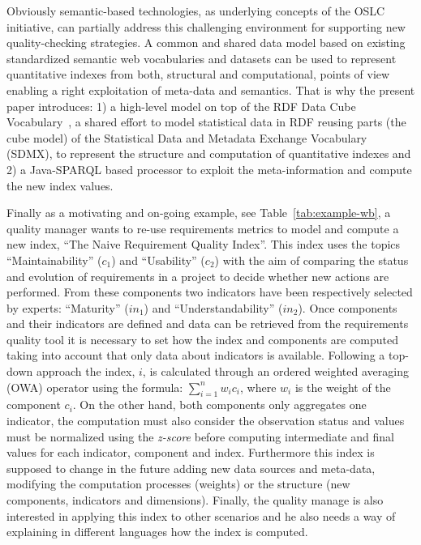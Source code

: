 % 
Obviously semantic-based technologies, as underlying concepts of the OSLC initiative, can partially address this challenging environment for supporting 
new quality-checking strategies. A common and shared data model based on existing standardized semantic web vocabularies and datasets can be used to 
represent quantitative indexes from both, structural and computational, points of view enabling a right exploitation of meta-data and semantics. 
That is why the present paper introduces: 1) a high-level model on top of the RDF Data Cube Vocabulary~\cite{rdf-data-cube}, a shared effort to model statistical data in RDF reusing parts 
(the cube model) of the Statistical Data and Metadata Exchange Vocabulary~\cite{sdmx} (SDMX), to represent the structure and computation of quantitative indexes and 
2) a Java-SPARQL based processor to exploit the meta-information and compute the new index values.
% 

% 
Finally as a motivating and on-going example, see Table~\ref{tab:example-wb}, a quality manager wants to re-use requirements metrics to model and compute a new index, 
``The Naive Requirement Quality Index''. This  index uses the topics ``Maintainability'' ($c_1$) and ``Usability'' ($c_2$) with the aim of 
comparing the status and evolution of requirements in a project to decide whether new actions are performed. 
From these components two indicators have been respectively selected by experts: ``Maturity'' ($in_1$) and ``Understandability'' ($in_2$). 
Once components and their indicators are defined and data can be retrieved from the requirements quality tool it is necessary to set how the index and 
components are computed taking into account that only data about indicators is available. Following a top-down approach the index, $i$, is calculated through 
an ordered weighted averaging (OWA) operator using the formula: $\sum_{i=1}^n  w_i c_i$, where $w_i$ is the weight of the component $c_i$. On the other hand, 
both components only aggregates one indicator, the computation must also consider the observation status and values must be normalized using the 
\textit{z-score} before computing intermediate and final values for each indicator, component and index. Furthermore this index is supposed to 
change in the future adding new data sources and meta-data, modifying the computation processes (weights) or the structure (new components, indicators and dimensions). 
Finally, the quality manage is also interested in applying this index to other scenarios and he also needs a way of explaining in different 
languages how the index is computed. 


